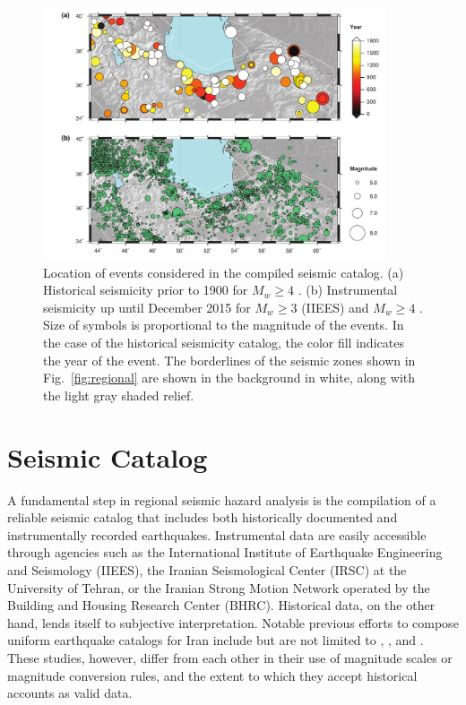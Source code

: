 
\begin{figure}[t] 
	\centering
	\includegraphics[width=0.9\textwidth]{figures/pdf/figure-03}
	\caption{Location of events considered in the compiled seismic catalog. (a) Historical seismicity prior to 1900 for $M_w \geq 4$ \citep[after][]{Zare2014}. (b) Instrumental seismicity up until December 2015 for $M_w \geq 3$ (IIEES) and $M_w \geq 4$ \citep[after][]{Zare2014}. Size of symbols is proportional to the magnitude of the events. In the case of the historical seismicity catalog, the color fill indicates the year of the event. The borderlines of the seismic zones shown in Fig.~\ref{fig:regional} are shown in the background in white, along with the light gray shaded relief.}
	\label{fig:catalog}
\end{figure}

\section{Seismic Catalog}

A fundamental step in regional seismic hazard analysis is the compilation of a reliable seismic catalog that includes both historically documented and instrumentally recorded earthquakes. Instrumental data are easily accessible through agencies such as the International Institute of Earthquake Engineering and Seismology (IIEES), the Iranian Seismological Center (IRSC) at the University of Tehran, or the Iranian Strong Motion Network operated by the Building and Housing Research Center (BHRC). Historical data, on the other hand, lends itself to subjective interpretation. Notable previous efforts to compose uniform earthquake catalogs for Iran include but are not limited to \citet{moinfar1994}, \citet{Berberian1994}, and \citet{Ambraseys2005}. These studies, however, differ from each other in their use of magnitude scales or magnitude conversion rules, and the extent to which they accept historical accounts as valid data. 

